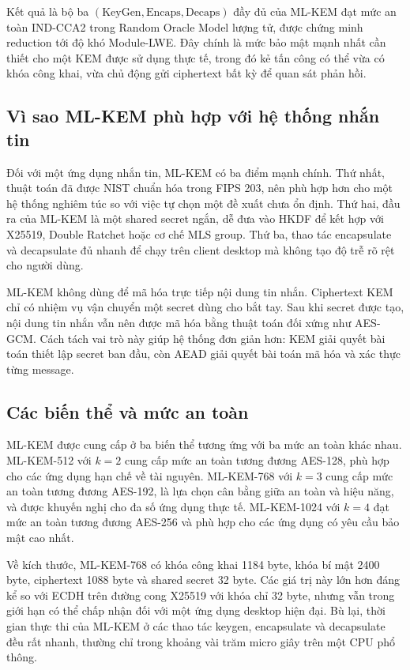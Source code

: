 Kết quả là bộ ba $(\text{KeyGen}, \text{Encaps}, \text{Decaps})$ đầy đủ của ML-KEM đạt mức an toàn IND-CCA2 trong Random Oracle Model lượng tử, được chứng minh reduction tới độ khó Module-LWE. Đây chính là mức bảo mật mạnh nhất cần thiết cho một KEM được sử dụng thực tế, trong đó kẻ tấn công có thể vừa có khóa công khai, vừa chủ động gửi ciphertext bất kỳ để quan sát phản hồi.

\subsection{Vì sao ML-KEM phù hợp với hệ thống nhắn tin}

Đối với một ứng dụng nhắn tin, ML-KEM có ba điểm mạnh chính. Thứ nhất, thuật toán đã được NIST chuẩn hóa trong FIPS 203, nên phù hợp hơn cho một hệ thống nghiêm túc so với việc tự chọn một đề xuất chưa ổn định. Thứ hai, đầu ra của ML-KEM là một shared secret ngắn, dễ đưa vào HKDF để kết hợp với X25519, Double Ratchet hoặc cơ chế MLS group. Thứ ba, thao tác encapsulate và decapsulate đủ nhanh để chạy trên client desktop mà không tạo độ trễ rõ rệt cho người dùng.

ML-KEM không dùng để mã hóa trực tiếp nội dung tin nhắn. Ciphertext KEM chỉ có nhiệm vụ vận chuyển một secret dùng cho bắt tay. Sau khi secret được tạo, nội dung tin nhắn vẫn nên được mã hóa bằng thuật toán đối xứng như AES-GCM. Cách tách vai trò này giúp hệ thống đơn giản hơn: KEM giải quyết bài toán thiết lập secret ban đầu, còn AEAD giải quyết bài toán mã hóa và xác thực từng message.

\subsection{Các biến thể và mức an toàn}

ML-KEM được cung cấp ở ba biến thể tương ứng với ba mức an toàn khác nhau. ML-KEM-512 với $k=2$ cung cấp mức an toàn tương đương AES-128, phù hợp cho các ứng dụng hạn chế về tài nguyên. ML-KEM-768 với $k=3$ cung cấp mức an toàn tương đương AES-192, là lựa chọn cân bằng giữa an toàn và hiệu năng, và được khuyến nghị cho đa số ứng dụng thực tế. ML-KEM-1024 với $k=4$ đạt mức an toàn tương đương AES-256 và phù hợp cho các ứng dụng có yêu cầu bảo mật cao nhất.

Về kích thước, ML-KEM-768 có khóa công khai 1184 byte, khóa bí mật 2400 byte, ciphertext 1088 byte và shared secret 32 byte. Các giá trị này lớn hơn đáng kể so với ECDH trên đường cong X25519 với khóa chỉ 32 byte, nhưng vẫn trong giới hạn có thể chấp nhận đối với một ứng dụng desktop hiện đại. Bù lại, thời gian thực thi của ML-KEM ở các thao tác keygen, encapsulate và decapsulate đều rất nhanh, thường chỉ trong khoảng vài trăm micro giây trên một CPU phổ thông.

